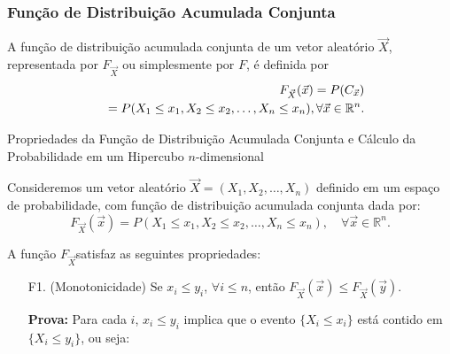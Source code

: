 \begin{frame}
\frametitle{{Função de Distribuição Acumulada Conjunta}}

\begin{defi}
A função de distribuição acumulada conjunta de um vetor aleatório
$\vec{X}$, representada por $F_{\vec{X}}$ ou simplesmente por $F$, é
definida por
%
\begin{eqnarray}
& & F_{\vec{X}}(\vec{x})=P(C_{\vec{x}})\nonumber \\
& & =P(X_1\leq x_1, X_2\leq x_2,\ldots,X_n\leq x_n), \forall \vec{x}\in \mathbb{R}^n.\nonumber
\end{eqnarray}
\end{defi}
%
%

\begin{block}{ Propriedades da Função de Distribuição Acumulada Conjunta e Cálculo da Probabilidade em um Hipercubo $n$-dimensional}

Consideremos um vetor aleatório \( \vec{X} = (X_1, X_2, \dots, X_n) \) definido em um espaço de probabilidade, com função de distribuição acumulada conjunta dada por:
\[
F_{\vec{X}}(\vec{x}) = P(X_1 \leq x_1, X_2 \leq x_2, \dots, X_n \leq x_n), \quad \forall \vec{x} \in \mathbb{R}^n.
\]

A função \( F_{\vec{X}} \)satisfaz as seguintes
propriedades:
\begin{enumerate}
\item[F1.](Monotonicidade) Se $x_i\leq y_i$, $\forall i\leq n$, então $F_{\vec{X}}(\vec{x})\leq F_{\vec{X}}(\vec{y})$.

\medskip
{\bf Prova:} Para cada \( i \), \( x_i \leq y_i \) implica que o evento \( \{ X_i \leq x_i \} \) está contido em \( \{ X_i \leq y_i \} \), ou seja:


\end{enumerate}
\end{block}
\end{frame}
